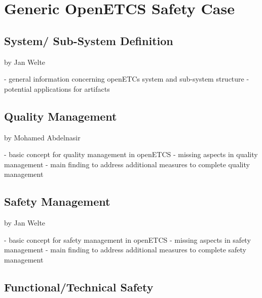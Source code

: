 \documentclass{template/openetcs_report}
\begin{document}
\chapter{Generic OpenETCS Safety Case}
\label{sec:hazardandrisk}

\section{System/ Sub-System Definition}

by Jan Welte

- general information concerning openETCs system and sub-system structure
- potential applications for artifacts

\section{Quality Management}

by Mohamed Abdelnasir

- basic concept for quality management in openETCS
- missing aspects in quality management
- main finding to address additional measures to complete quality management

\section{Safety Management}

by Jan Welte

- basic concept for safety management in openETCS
- missing aspects in safety management
- main finding to address additional measures to complete safety management

\section{Functional/Technical Safety}
\end{document}
